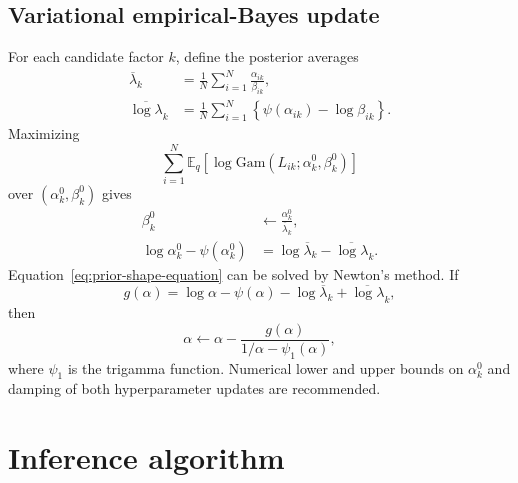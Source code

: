 \documentclass[11pt]{article}
\newcommand{\E}{\mathbb{E}}
\newcommand{\Gam}{\mathrm{Gam}}
\begin{document}
\subsection{Variational empirical-Bayes update}

For each candidate factor $k$, define the posterior averages
\begin{align}
  \overline{\lambda}_k
  &=
  \frac{1}{N}\sum_{i=1}^N
  \frac{\alpha_{ik}}{\beta_{ik}},
  \label{eq:mean-loading}\\
  \overline{\log\lambda}_k
  &=
  \frac{1}{N}\sum_{i=1}^N
  \left\{\psi(\alpha_{ik})-\log\beta_{ik}\right\}.
  \label{eq:mean-log-loading}
\end{align}
Maximizing
\[
  \sum_{i=1}^N
  \E_q\!\left[
    \log\Gam(L_{ik};\alpha_k^0,\beta_k^0)
  \right]
\]
over $(\alpha_k^0,\beta_k^0)$ gives
\begin{align}
  \beta_k^0
  &\leftarrow
  \frac{\alpha_k^0}{\overline{\lambda}_k},
  \label{eq:prior-rate-update}\\
  \log\alpha_k^0-\psi(\alpha_k^0)
  &=
  \log\overline{\lambda}_k-
  \overline{\log\lambda}_k.
  \label{eq:prior-shape-equation}
\end{align}
Equation~\eqref{eq:prior-shape-equation} can be solved by Newton's method.  If
\[
  g(\alpha)
  =
  \log\alpha-\psi(\alpha)
  -\log\overline{\lambda}_k
  +\overline{\log\lambda}_k,
\]
then
\begin{equation}
  \alpha
  \leftarrow
  \alpha-
  \frac{g(\alpha)}{1/\alpha-\psi_1(\alpha)},
  \label{eq:newton-update}
\end{equation}
where $\psi_1$ is the trigamma function.  Numerical lower and upper bounds on
$\alpha_k^0$ and damping of both hyperparameter updates are recommended.


\section{Inference algorithm}
\end{document}
